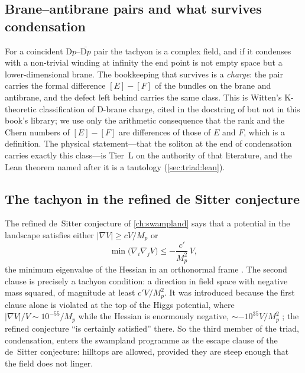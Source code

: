 \subsection{Brane--antibrane pairs and what survives condensation}

For a coincident D$p$--$\overline{\mathrm{D}p}$ pair the tachyon is a complex field, and if it
condenses with a non-trivial winding at infinity the end point is not empty space but a
lower-dimensional brane. The bookkeeping that survives is a \emph{charge}: the pair carries the
formal difference $[E]-[F]$ of the bundles on the brane and antibrane, and the defect left
behind carries the same class. This is Witten's K-theoretic classification of D-brane charge,
cited in the docstring of  but not in this book's library; we
use only the arithmetic consequence that the rank and the Chern numbers of $[E]-[F]$ are
differences of those of $E$ and $F$, which is a definition. The physical statement---that the
soliton at the end of condensation carries exactly this class---is Tier~L on the authority of
that literature, and the Lean theorem named after it is a tautology (\cref{sec:triad:lean}).

\subsection{The tachyon in the refined de Sitter conjecture}

The refined de~Sitter conjecture of \cref{ch:swampland} says that a potential in the landscape
satisfies either $|\nabla V|\ge cV/M_p$ or
\begin{equation}\label{eq:triad:rds}
\min\big(\nabla_i\nabla_jV\big)\le-\frac{c'}{M_p^2}\,V ,
\end{equation}
the minimum eigenvalue of the Hessian in an orthonormal frame . The second clause is precisely a tachyon condition: a direction in field
space with negative mass squared, of magnitude at least $c'V/M_p^2$. It was introduced because
the first clause alone is violated at the top of the Higgs potential, where
$|\nabla V|/V\sim10^{-55}/M_p$ while the Hessian is enormously negative,
$\sim-10^{35}V/M_p^2$ ; the refined conjecture ``is
certainly satisfied'' there. So the third member of the triad, condensation, enters the
swampland programme as the escape clause of the de~Sitter conjecture: hilltops are allowed,
provided they are steep enough that the field does not linger.

